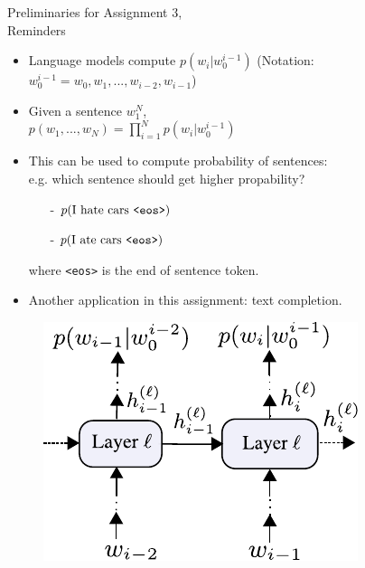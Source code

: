 \begin{frame}{Preliminaries for Assignment 3,\\ Reminders}
\begin{minipage}{0.6\linewidth}
\begin{itemize}
\item Language models compute $p(w_i | w_0^{i-1})$ (Notation: $w_0^{i-1} = w_0, w_1, ..., w_{i-2}, w_{i-1}$)
\item Given a sentence $w_1^N$,\\
$\displaystyle p(w_1, ..., w_N) = \prod_{i=1}^{N} p(w_i | w_0^{i-1})$
\item This can be used to compute probability of sentences:\\
e.g. which sentence should get higher propability?
\begin{itemize}
\item[-] $p(\text{I hate cars \texttt{<eos>}})$
\item[-] $p(\text{I ate cars \texttt{<eos>}})$
\end{itemize}
where \texttt{<eos>} is the end of sentence token.
\item Another application in this assignment: text completion.
\end{itemize}
\end{minipage}
\begin{minipage}{0.35\linewidth}
\begin{figure}
\centering
\includegraphics[width=1.\linewidth]{./figures/lm.pdf}
\end{figure}
\end{minipage}
\end{frame}

